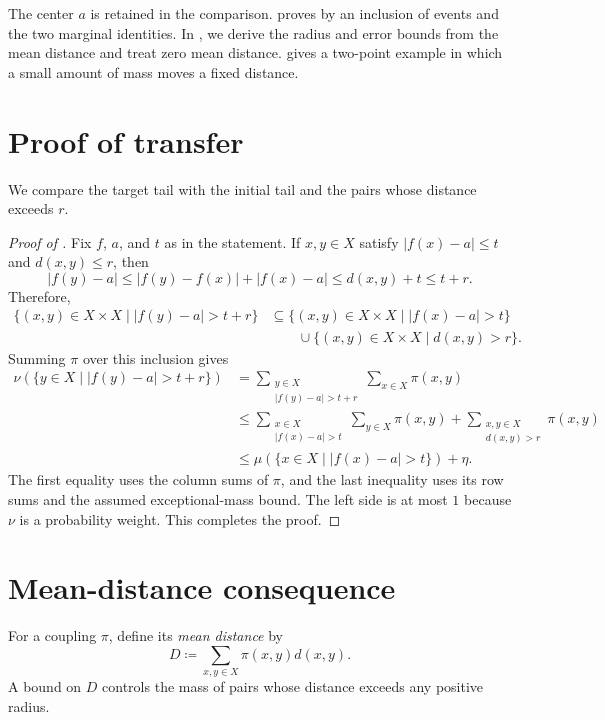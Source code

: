\documentclass[a4paper,11pt]{article}
\theoremstyle{definition}
\theoremstyle{remark}
\begin{document}
The center $a$ is retained in the comparison.  proves  by an inclusion of events and the two marginal identities. In , we derive the radius and error bounds from the mean distance and treat zero mean distance.  gives a two-point example in which a small amount of mass moves a fixed distance.

\section{Proof of transfer}\label{sec:proof}

We compare the target tail with the initial tail and the pairs whose distance exceeds $r$.

\begin{proof}[Proof of ]
Fix $f$, $a$, and $t$ as in the statement. If $x,y\in X$ satisfy $|f(x)-a|\leq t$ and $d(x,y)\leq r$, then
\[ |f(y)-a|\leq |f(y)-f(x)|+|f(x)-a|\leq d(x,y)+t\leq t+r. \]
Therefore,
\begin{align*}
\{(x,y)\in X\times X\mid |f(y)-a|>t+r\}
&\subseteq\{(x,y)\in X\times X\mid |f(x)-a|>t\}\\
&\qquad\cup\{(x,y)\in X\times X\mid d(x,y)>r\}.
\end{align*}
Summing $\pi$ over this inclusion gives
\begin{align*}
\nu(\{y\in X\mid |f(y)-a|>t+r\})
&=\sum_{\substack{y\in X\\|f(y)-a|>t+r}}\sum_{x\in X}\pi(x,y)\\
&\leq\sum_{\substack{x\in X\\|f(x)-a|>t}}\sum_{y\in X}\pi(x,y)+\sum_{\substack{x,y\in X\\d(x,y)>r}}\pi(x,y)\\
&\leq\mu(\{x\in X\mid |f(x)-a|>t\})+\eta.
\end{align*}
The first equality uses the column sums of $\pi$, and the last inequality uses its row sums and the assumed exceptional-mass bound. The left side is at most $1$ because $\nu$ is a probability weight. This completes the proof.
\end{proof}

\section{Mean-distance consequence}\label{sec:mean}

For a coupling $\pi$, define its \emph{mean distance} by
\[ D\coloneqq\sum_{x,y\in X}\pi(x,y)d(x,y). \]
A bound on $D$ controls the mass of pairs whose distance exceeds any positive radius.
\end{document}
